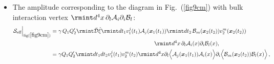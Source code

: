 \begin{itemize}
\begin{align}
\begin{split}
=\frac{\gamma Q_1 Q_2'}{4\pi}\rmint dt\, (\boldsymbol{v}_1\cdot \boldsymbol{v}_2) \frac{e^{-\mu_{\gamma}r}}{r}+(1\leftrightarrow 2)\,\sim \mathcal{O}(L v^2)\,.
\end{split}
\end{align}
\item The amplitude corresponding to the diagram in Fig.~(\ref{fig9cm}) with bulk interaction vertex $\rmint d^4x\,\partial_l\mathcal{A}_i\partial_i\mathcal{B}_l$:
\begin{align}
    \begin{split}
   \mathcal{S}_{\text{eff}}\Big|_{\text{fig}(\ref{fig9cm})}&=\gamma \,Q_1 Q_2'\rmint\Bar{\mathcal{D}}\Hat{\xi}\rmint dt_1v_1^j(t_1)\mathcal{A}_j(\boldsymbol{x}_1(t_1))\rmint dt_2\, \mathcal{B}_m(\boldsymbol{x}_2(t_2))v_2^m(\boldsymbol{x}_2(t_2))\\ &\hspace{6.5 cm}\rmint d^4x\,\partial_l\mathcal{A}_i(x)\partial_i\mathcal{B}_l(x),\\&=\gamma Q_1 Q_2'\rmint dt_1dt_2v_1^j(t_1)v_2^m(t_2)\rmint d^4x\partial_l\Big{\langle}\mathcal{A}_j(\boldsymbol{x}_1(t_1))\mathcal{A}_i(x)\Big{\rangle}\partial_i\Big{\langle}\mathcal{B}_m(\boldsymbol{x}_2(t_2))\mathcal{B}_l(x)\Big{\rangle}\,,\\ &

\end{split}
\end{align}
\end{itemize}

